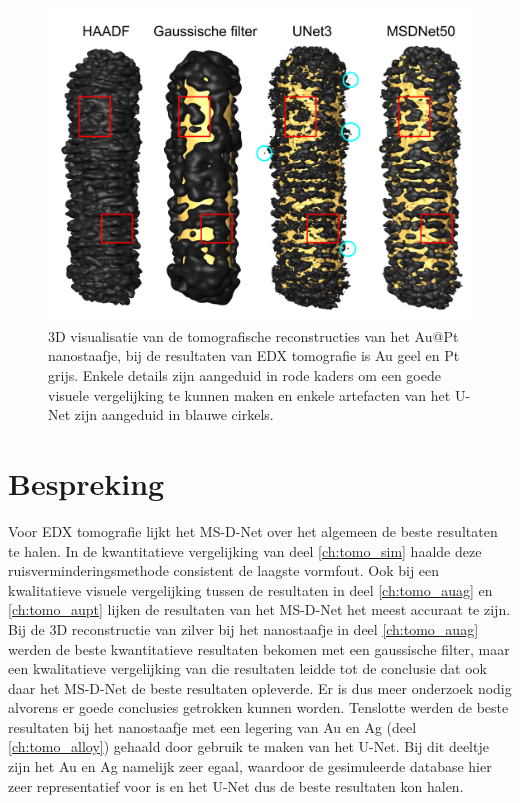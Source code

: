 \documentclass{report}
\begin{document}
\begin{figure}[h!]
	\centering
	\includegraphics[width=15cm]{images/tomo/aupt_3d.png}
	\caption{3D visualisatie van de tomografische reconstructies van het Au@Pt nanostaafje, bij de resultaten van EDX tomografie is Au geel en Pt grijs. Enkele details zijn aangeduid in rode kaders om een goede visuele vergelijking te kunnen maken en enkele artefacten van het U-Net zijn aangeduid in blauwe cirkels.}
	\label{fig:tomo_aupt3d}
\end{figure}

\newpage
\section{Bespreking}
Voor EDX tomografie lijkt het MS-D-Net over het algemeen de beste resultaten te halen. In de kwantitatieve vergelijking van deel \ref{ch:tomo_sim} haalde deze ruisverminderingsmethode consistent de laagste vormfout. Ook bij een kwalitatieve visuele vergelijking tussen de resultaten in deel \ref{ch:tomo_auag} en \ref{ch:tomo_aupt} lijken de resultaten van het MS-D-Net het meest accuraat te zijn. Bij de 3D reconstructie van zilver bij het nanostaafje in deel \ref{ch:tomo_auag} werden de beste kwantitatieve resultaten bekomen met een gaussische filter, maar een kwalitatieve vergelijking van die resultaten leidde tot de conclusie dat ook daar het MS-D-Net de beste resultaten opleverde. Er is dus meer onderzoek nodig alvorens er goede conclusies getrokken kunnen worden. Tenslotte werden de beste resultaten bij het nanostaafje met een legering van Au en Ag (deel \ref{ch:tomo_alloy}) gehaald door gebruik te maken van het U-Net. Bij dit deeltje zijn het Au en Ag namelijk zeer egaal, waardoor de gesimuleerde database hier zeer representatief voor is en het U-Net dus de beste resultaten kon halen.
\end{document}
